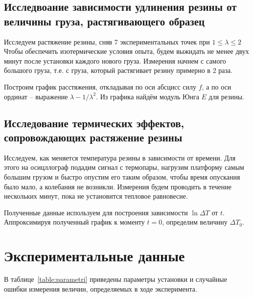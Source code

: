 \documentclass[a4paper,12pt]{article} %
\begin{document}
	\subsection{Исследвоание зависимости удлинения резины от величины груза, растягивающего образец}
		Исследуем растяжение резины, сняв 7 экспериментальных точек при $1 \leq \lambda \leq 2$ Чтобы обеспечить изотермические условия опыта, будем выжидать не менее двух минут после установки каждого нового груза. Измерения начнем с самого большого груза, т.е. с груза, который растягивает резину примерно в 2 раза.
		
		Построим график расстяжения, откладывая по оси абсцисс силу $f$, а по оси ординат -- выражение $\lambda - 1 / \lambda^2$. Из графика найдём модуль Юнга $E$ для резины.
		
		
	\subsection{Исследование термических эффектов, сопровождающих растяжение резины}
		Исследуем, как меняется температура резины в зависимости от времени. Для этого на осицллограф подадим сигнал с термопары, нагрузим платформу самым большим грузом и быстро опустим его таким образом, чтобы время опускания было мало, а колебания не возникли. Измерения будем проводить в течение нескольких минут, пока не установится тепловое равновесие.
		
		Полученные данные используем для построения зависимости $\ln \Delta T$ от $t$. Аппроксимируя полученный график к моменту $t = 0$, определим величину $\Delta T_0$.
		
		
\section{Экспериментальные данные}
	В таблице~\ref{table:parametri} приведены параметры установки и случайные ошибки измерения величин, определяемых в ходе эксперимента.
	
\end{document}
